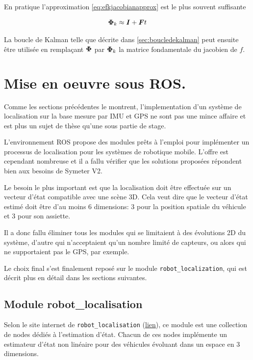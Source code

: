 \documentclass[12pt,a4paper]{report}
\begin{document}
	\para En pratique l'approximation \ref{eq:efkjacobianapprox} est le plus souvent suffisante
	
	\begin{equation}
	\label{eq:efkjacobianapprox}
	\boldsymbol{\Phi}_k \approx \boldsymbol I + \boldsymbol Ft
	\end{equation}
	
	La boucle de Kalman telle que décrite dans \ref{sec:boucledekalman} peut ensuite être utilisée en remplaçant $\boldsymbol{\Phi}$ par $\boldsymbol{\Phi}_k$ la matrice fondamentale du jacobien de $f$.

	
	\section{Mise en oeuvre sous ROS.} Comme les sections précédentes le montrent, l'implementation d'un système de localisation sur la base mesure par IMU et GPS ne sont pas une mince affaire et est plus un sujet de thèse qu'une sous partie de stage. 
	
	\para L'environnement ROS propose des modules prêts à l'emploi pour implémenter un processus de localisation pour les systèmes de robotique mobile. L'offre est cependant nombreuse et il a fallu vérifier que les solutions proposées répondent bien aux besoins de Symeter V2.
	
	\para Le besoin le plus important est que la localisation doit être effectuée sur un vecteur d'état compatible avec une scène 3D. Cela veut dire que le vecteur d'état estimé doit être d'au moins 6 dimensions: 3 pour la position spatiale du véhicule et 3 pour son assiette.
	
	\para Il a donc fallu éliminer tous les modules qui se limitaient à des évolutions 2D du système, d'autre qui n'acceptaient qu'un nombre limité de capteurs, ou alors qui ne supportaient pas le GPS, par exemple.
	
	\para Le choix final s'est finalement reposé sur le module \verb|robot_localization|, qui est décrit plus en détail dans les sections suivantes.
	
	\subsection{Module robot\_localisation}
	Selon le site internet de \verb|robot_localisation| (\href{http://docs.ros.org/melodic/api/robot_localization/html/index.html}{lien}), ce module est une collection de nodes dédiés à l'estimation d'état. Chacun de ces nodes implémente un estimateur d'état non linéaire pour des véhicules évoluant dans un espace en 3 dimensions.
	
\end{document}
